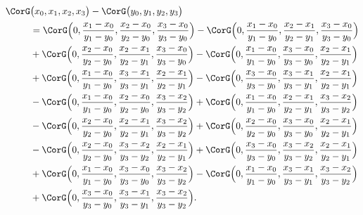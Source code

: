 \documentclass[a4paper]{amsart}
\begin{document}
\begin{align*}
\CorG&\bigl(x_0,x_1,x_2,x_3\bigr)
-\CorG\bigl(y_0,y_1,y_2,y_3\bigr)\\
&=\CorG\Bigl(
0,
\frac{x_1-x_0}{y_1-y_0},
\frac{x_2-x_0}{y_2-y_0},
\frac{x_3-x_0}{y_3-y_0}
\Bigr)
-\CorG\Bigl(
0,
\frac{x_1-x_0}{y_1-y_0},
\frac{x_2-x_1}{y_2-y_1},
\frac{x_3-x_0}{y_3-y_0}
\Bigr)\\
&+\CorG\Bigl(
0,
\frac{x_2-x_0}{y_2-y_0},
\frac{x_2-x_1}{y_2-y_1},
\frac{x_3-x_0}{y_3-y_0}
\Bigr)
-\CorG\Bigl(
0,
\frac{x_1-x_0}{y_1-y_0},
\frac{x_3-x_0}{y_3-y_0},
\frac{x_2-x_1}{y_2-y_1}
\Bigr)\\
&
+\CorG\Bigl(
0,
\frac{x_1-x_0}{y_1-y_0},
\frac{x_3-x_1}{y_3-y_1},
\frac{x_2-x_1}{y_2-y_1}
\Bigr)
-\CorG\Bigl(
0,
\frac{x_3-x_0}{y_3-y_0},
\frac{x_3-x_1}{y_3-y_1},
\frac{x_2-x_1}{y_2-y_1}
\Bigr)\\
&
-\CorG\Bigl(
0,
\frac{x_1-x_0}{y_1-y_0},
\frac{x_2-x_0}{y_2-y_0},
\frac{x_3-x_2}{y_3-y_2}
\Bigr)
+\CorG\Bigl(
0,
\frac{x_1-x_0}{y_1-y_0},
\frac{x_2-x_1}{y_2-y_1},
\frac{x_3-x_2}{y_3-y_2}
\Bigr)\\
&-\CorG\Bigl(0,\frac{x_2-x_0}{y_2-y_0},
\frac{x_2-x_1}{y_2-y_1},
\frac{x_3-x_2}{y_3-y_2}
\Bigr)
+\CorG\Bigl(0,
\frac{x_2-x_0}{y_2-y_0},
\frac{x_3-x_0}{y_3-y_0},
\frac{x_2-x_1}{y_2-y_1}
\Bigr)\\
&-\CorG\Bigl(0,\frac{x_2-x_0}{y_2-y_0},\frac{x_3-x_2}{y_3-y_2},
\frac{x_2-x_1}{y_2-y_1}\Bigr)
+\CorG\Bigl(0,\frac{x_3-x_0}{y_3-y_0},
\frac{x_3-x_2}{y_3-y_2},
\frac{x_2-x_1}{y_2-y_1}\Bigr)\\
&+\CorG\Bigl(0,
\frac{x_1-x_0}{y_1-y_0},
\frac{x_3-x_0}{y_3-y_0},
\frac{x_3-x_2}{y_3-y_2}
\Bigr)
-\CorG\Bigl(0,
\frac{x_1-x_0}{y_1-y_0},
\frac{x_3-x_1}{y_3-y_1},
\frac{x_3-x_2}{y_3-y_2}
\Bigr)\\
&+\CorG\Bigl(0,
\frac{x_3-x_0}{y_3-y_0},
\frac{x_3-x_1}{y_3-y_1},
\frac{x_3-x_2}{y_3-y_2}
\Bigr).
\end{align*}
\end{document}
